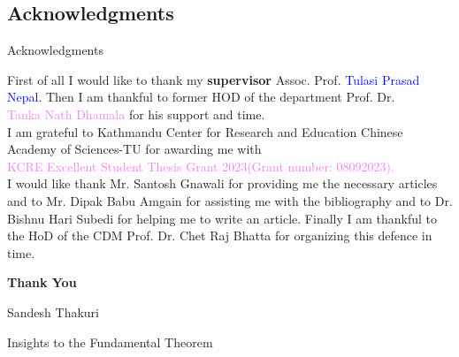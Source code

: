 \documentclass{beamer}
\begin{document}
\subsection{Acknowledgments}
\begin{frame}{Acknowledgments}

  First of all I would like to thank my \textbf{supervisor} Assoc. Prof. \textcolor{blue}{Tulasi Prasad Nepal}. Then I am thankful to former HOD of the department Prof. Dr.\\
  \textcolor{violet}{Tanka Nath Dhamala} for his support and time.\\[4mm]

I am grateful to Kathmandu Center for Research and Education Chinese Academy of Sciences-TU for awarding me with \\
\textcolor{violet}{KCRE Excellent Student Thesis Grant 2023(Grant number: 08092023).}\\[4mm]

I would like thank  Mr. \textcolor{green!50!black}{Santosh Gnawali} for providing me the necessary articles and to Mr. \textcolor{green!50!black}{Dipak Babu Amgain} for assisting me with the bibliography and to Dr. \textcolor{green!50!black}{Bishnu Hari Subedi} for helping me to write an article. Finally I am thankful to the HoD of the CDM  Prof. Dr. \textcolor{green!50!black}{Chet Raj Bhatta} for organizing this defence in time.
\\[4mm]
\begin{center}
  \large \bfseries \color{magenta}
  Thank You
  \end{center}
\begin{minipage}{1\textwidth}
	\begin{flushright}
		{\color {blue} Sandesh Thakuri}\\
	\end{flushright}
      \end{minipage}
    \end{frame}
    \begin{frame}
      \Large
      \begin{center}
        Insights to the Fundamental Theorem
        \end{center}
    \end{frame}
\end{document}
